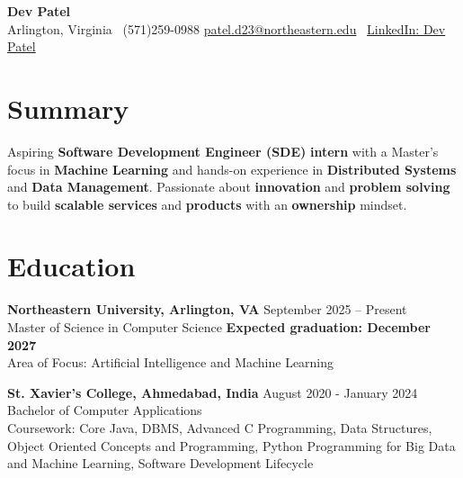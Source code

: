 \documentclass[a4paper,10pt]{article}
\begin{document}
\begin{center}
\vspace{-3mm}
    \fontsize{16}{18}\selectfont \textbf{Dev Patel} \\
    \vspace{0mm}
    \normalsize Arlington, Virginia \textbar\ (571)259-0988  \textbar       \href{mailto:patel.d23@northeastern.edu}{patel.d23@northeastern.edu} \textbar\ \href{https://www.linkedin.com/in/devxpatel//}{LinkedIn: Dev Patel} \\
\end{center}



\section*{Summary}
Aspiring \textbf{Software Development Engineer (SDE)} \textbf{intern} with a Master's focus in \textbf{Machine Learning} and hands-on experience in \textbf{Distributed Systems} and \textbf{Data Management}. Passionate about \textbf{innovation} and \textbf{problem solving} to build \textbf{scalable services} and \textbf{products} with an \textbf{ownership} mindset.
 
\vspace{ 0 mm}
\section*{Education}
\textbf{Northeastern University, Arlington, VA} \hfill September 2025 -- Present\\
Master of Science in Computer Science \hfill \textbf{Expected graduation: December 2027} \\
Area of Focus: Artificial Intelligence and Machine Learning

\vspace{1 mm} %
\textbf{St. Xavier's College, Ahmedabad, India} \hfill August 2020 - January 2024 \\
Bachelor of Computer Applications\\
Coursework: Core Java, DBMS, Advanced C Programming, Data Structures, Object Oriented Concepts and Programming, Python Programming for Big Data and Machine Learning, Software Development Lifecycle
\end{document}
